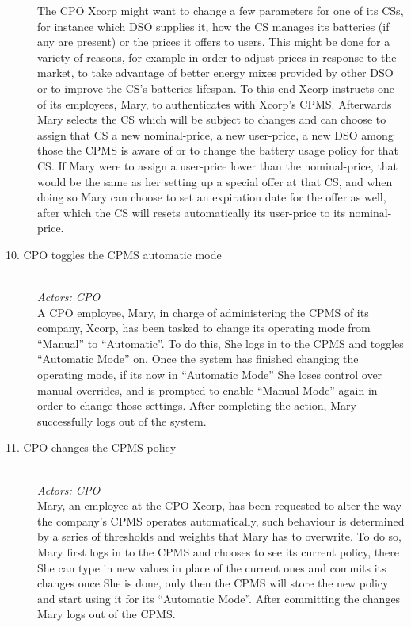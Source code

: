 \documentclass[11pt]{article}
\begin{document}
\begin{description}
        The CPO Xcorp might want to change a few parameters for one of its CSs, for instance which DSO supplies it, how the CS manages its batteries (if any are present) or the prices it offers to users. This might be done for a variety of reasons, for example in order to adjust prices in response to the market, to take advantage of better energy mixes provided by other DSO or to improve the CS's batteries lifespan. To this end Xcorp instructs one of its employees, Mary, to authenticates with Xcorp's CPMS. Afterwards Mary selects the CS which will be subject to changes and can choose to assign that CS a new nominal-price, a new user-price, a new DSO among those the CPMS is aware of or to change the battery usage policy for that CS. If Mary were to assign a user-price lower than the nominal-price, that would be the same as her setting up a special offer at that CS, and when doing so Mary can choose to set an expiration date for the offer as well, after which the CS will resets automatically its user-price to its nominal-price.
    
    \newpage
    
    \item [10. CPO toggles the CPMS automatic mode] \hfill \\
        \textit{Actors: CPO} \\
        A CPO employee, Mary, in charge of administering the CPMS of its company, Xcorp, has been tasked to change its operating mode from “Manual” to “Automatic”. To do this, She logs in to the CPMS and toggles “Automatic Mode” on. Once the system has finished changing the operating mode, if its now in “Automatic Mode” She loses control over manual overrides, and is prompted to enable “Manual Mode” again in order to change those settings. After completing the action, Mary successfully logs out of the system. \hfill \\
    \item [11. CPO changes the CPMS policy] \hfill \\
        \textit{Actors: CPO} \\
        Mary, an employee at the CPO Xcorp, has been requested to alter the way the company's CPMS operates automatically, such behaviour is determined by a series of thresholds and weights that Mary has to overwrite. To do so, Mary first logs in to the CPMS and chooses to see its current policy, there She can type in new values in place of the current ones and commits its changes once She is done, only then the CPMS will store the new policy and start using it for its “Automatic Mode”. After committing the changes Mary logs out of the CPMS. \hfill \\
\end{description}
\end{document}
